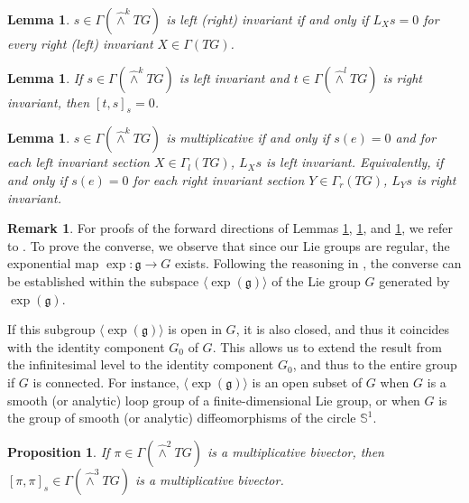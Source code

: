 \documentclass[11pt,reqno]{amsart}
\newtheorem{lemma}[theorem]{Lemma}
\newtheorem{proposition}[theorem]{Proposition}
\theoremstyle{definition}
\newtheorem{remark}[theorem]{Remark}
\numberwithin{equation}{section}
\begin{document}
\begin{lemma}\label{8.10}
$s \in \Gamma(\hat\wedge^k TG)$ is left (right) invariant if and only if $L_X s = 0$ for every right (left) invariant $X \in \Gamma(TG)$.
\end{lemma}

\begin{lemma}\label{8.11}
If $s \in \Gamma(\hat\wedge^k TG)$ is left invariant and $t \in \Gamma(\hat\wedge^l TG)$ is right invariant, then $[t, s]_s = 0$.
\end{lemma}

\begin{lemma}\label{8.12}
$s \in \Gamma(\hat\wedge^k TG)$ is multiplicative if and only if $s(e) = 0$ and for each left invariant section $X \in \Gamma_l(TG)$, $L_X s$ is left invariant. Equivalently, if and only if $s(e) = 0$ for each right invariant section $Y \in \Gamma_r(TG)$, $L_Y s$ is right invariant.
\end{lemma}

\begin{remark}

For proofs of the forward directions of Lemmas \ref{8.10}, \ref{8.11}, and \ref{8.12}, we refer to \cite[Proposition 10.5]{33}. To prove the converse, we observe that since our Lie groups are regular, the exponential map $\exp : \mathfrak{g} \rightarrow G$ exists. 
Following the reasoning in \cite[Proposition 10.5]{33}, the converse can be established within the subspace $\langle \exp(\mathfrak{g}) \rangle$ of the Lie group $G$ generated by $\exp(\mathfrak g)$.

If this subgroup $\langle \exp(\mathfrak{g}) \rangle$ is open in $G$, it is also closed, and thus it coincides with the identity component $G_0$ of $G$. This allows us to extend the result from the infinitesimal level to the identity component $G_0$, and thus to the entire group if $G$ is connected. For instance, $\langle \exp(\mathfrak{g}) \rangle$ is an open subset of $G$ when $G$ is a smooth (or analytic) loop group of a finite-dimensional Lie group, or when $G$ is the group of smooth (or analytic) diffeomorphisms of the circle $\mathbb{S}^1$.
\end{remark}

\begin{proposition}\label{[]=0}
If $\pi \in \Gamma(\hat\wedge^2 TG)$ is a multiplicative bivector, then $[\pi, \pi]_s \in \Gamma(\hat\wedge^3 TG)$ is a multiplicative bivector.
\end{proposition}
\end{document}
